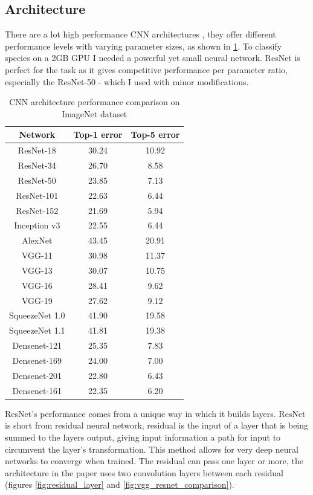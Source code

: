 \documentclass[times, utf8, diplomski]{fer}
\begin{document}
\subsection{Architecture}
\label{se:architecture}

There are a lot high performance CNN architectures \citep{he_deep_2016, simonyan_very_2014, szegedy_going_2015}, they offer different performance levels with varying parameter sizes, as shown in \ref{tb:CNN_architecutre_performance}. To classify species on a 2GB GPU I needed a powerful yet small neural network. ResNet is perfect for the task as it gives competitive performance per parameter ratio, especially the ResNet-50 - which I used with minor modifications.

\begin{table}
\centering
\caption{CNN architecture performance comparison on ImageNet dataset}
\label{tb:CNN_architecutre_performance}
\begin{tabular}{ccc}
\hline 
Network	& Top-1 error & Top-5 error \\  \hline
ResNet-18 & 30.24 & 10.92 \\
ResNet-34 & 26.70 & 8.58 \\ 
ResNet-50 & 23.85 & 7.13 \\ 
ResNet-101 & 22.63 & 6.44 \\ 
ResNet-152 & 21.69 & 5.94 \\  \hline
Inception v3 & 22.55 & 6.44 \\  \hline
AlexNet & 43.45 & 20.91 \\  \hline
VGG-11 & 30.98 & 11.37 \\ 
VGG-13 & 30.07 & 10.75 \\ 
VGG-16 & 28.41 & 9.62 \\ 
VGG-19 & 27.62 & 9.12 \\  \hline
SqueezeNet 1.0 & 41.90 & 19.58 \\ 
SqueezeNet 1.1 & 41.81 & 19.38 \\  \hline
Densenet-121 & 25.35 & 7.83 \\ 
Densenet-169 & 24.00 & 7.00 \\ 
Densenet-201 & 22.80 & 6.43 \\ 
Densenet-161 & 22.35 & 6.20 \\ 
\hline 
\end{tabular} 
\end{table}


ResNet's performance comes from a unique way in which it builds layers. ResNet is short from residual neural network, residual is the input of a layer that is being summed to the layers output, giving input information a path for input to circumvent the layer's transformation. This method allows for very deep neural networks to converge when trained. The residual can pass one layer or more, the architecture in the paper uses two convolution layers between each residual (figures \ref{fig:residual_layer} and \ref{fig:vgg_resnet_comparison}).
\end{document}
